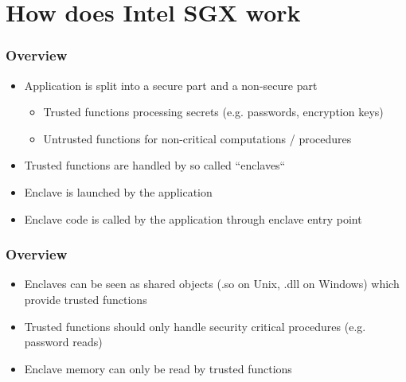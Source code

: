 \section{How does Intel SGX work}

\begin{frame}
    \frametitle{Overview}
    \begin{itemize}[<+->]
        \item Application is split into a secure part and a non-secure part
        \begin{itemize}
            \item Trusted functions processing secrets (e.g. passwords, encryption keys)
            \item Untrusted functions for non-critical computations / procedures
        \end{itemize}
        \item Trusted functions are handled by so called ``enclaves``
        \item Enclave is launched by the application
        \item Enclave code is called by the application through enclave entry point
    \end{itemize}
\end{frame}

\begin{frame}
    \frametitle{Overview}
    \begin{itemize}[<+->]
        \item Enclaves can be seen as shared objects (.so on Unix, .dll on Windows) which provide trusted functions
        \item Trusted functions should only handle security critical procedures (e.g. password reads)
        \item Enclave memory can only be read by trusted functions
    \end{itemize}
    \centering
\end{frame}



